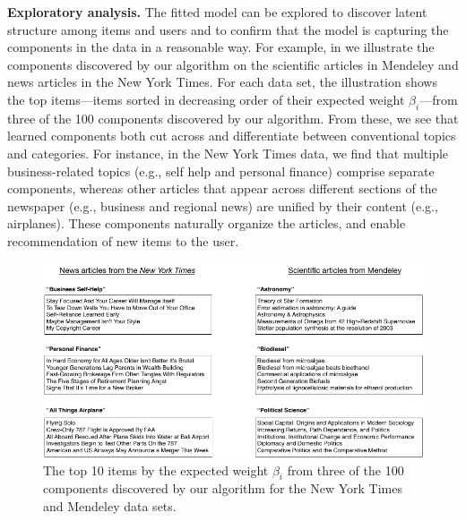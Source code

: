 
{\bf Exploratory analysis.} The fitted model can be explored to
discover latent structure among items and users and to confirm that
the model is capturing the components in the data in a reasonable
way. For example, in  we illustrate the components
discovered by our algorithm on the scientific articles in Mendeley and
news articles in the New York Times. For each data set, the
illustration shows the top items---items sorted in decreasing order of
their expected weight $\beta_i$---from three of the 100 components
discovered by our algorithm. From these, we see that learned
components both cut across and differentiate between conventional
topics and categories. For instance, in the New York Times data, we find
that multiple business-related topics (e.g., self help and personal
finance) comprise separate components, whereas other articles that
appear across different sections of the newspaper (e.g., business and
regional news) are unified by their content (e.g., airplanes). These
components naturally organize the articles, and enable recommendation
of new items to the user.


\begin{figure}
\centering
\includegraphics[width=\textwidth]{./figures/attributes.pdf}
\caption{The top 10 items by the expected weight $\beta_i$ from three
  of the 100 components discovered by our algorithm for the New York
  Times and Mendeley data sets.}
\label{fig:components}
\end{figure}
